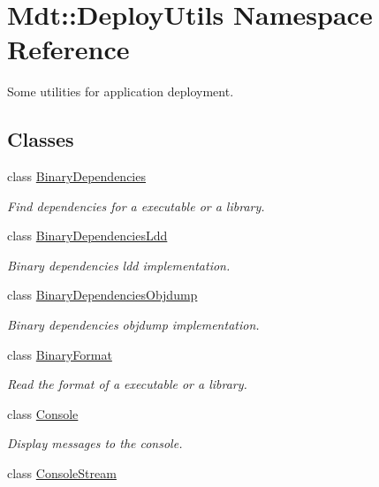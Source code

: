 \hypertarget{namespace_mdt_1_1_deploy_utils}{}\section{Mdt\+:\+:Deploy\+Utils Namespace Reference}
\label{namespace_mdt_1_1_deploy_utils}


Some utilities for application deployment.  


\subsection*{Classes}
\begin{DoxyCompactItemize}
\item 
class \hyperlink{class_mdt_1_1_deploy_utils_1_1_binary_dependencies}{Binary\+Dependencies}
\begin{DoxyCompactList}\small\item\em Find dependencies for a executable or a library. \end{DoxyCompactList}\item 
class \hyperlink{class_mdt_1_1_deploy_utils_1_1_binary_dependencies_ldd}{Binary\+Dependencies\+Ldd}
\begin{DoxyCompactList}\small\item\em Binary dependencies ldd implementation. \end{DoxyCompactList}\item 
class \hyperlink{class_mdt_1_1_deploy_utils_1_1_binary_dependencies_objdump}{Binary\+Dependencies\+Objdump}
\begin{DoxyCompactList}\small\item\em Binary dependencies objdump implementation. \end{DoxyCompactList}\item 
class \hyperlink{class_mdt_1_1_deploy_utils_1_1_binary_format}{Binary\+Format}
\begin{DoxyCompactList}\small\item\em Read the format of a executable or a library. \end{DoxyCompactList}\item 
class \hyperlink{class_mdt_1_1_deploy_utils_1_1_console}{Console}
\begin{DoxyCompactList}\small\item\em Display messages to the console. \end{DoxyCompactList}\item 
class \hyperlink{class_mdt_1_1_deploy_utils_1_1_console_stream}{Console\+Stream}

\end{DoxyCompactItemize}
